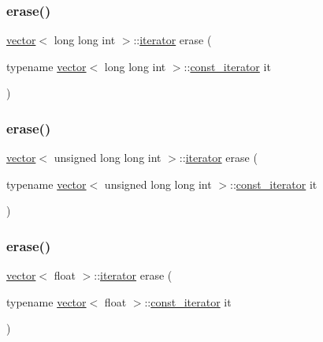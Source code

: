 \mbox{\label{classvector_a20e68bb7349c1076f3cd6d6a8310ac0a}} 
\subsubsection{\texorpdfstring{erase()}{erase()}\hspace{0.1cm}{\footnotesize\ttfamily [12/28]}}
{\footnotesize\ttfamily \mbox{\hyperlink{classvector}{vector}}$<$ long long int $>$\+::\mbox{\hyperlink{classvector_a35c955cacac6aacaa1e82874b1628865}{iterator}} erase (\begin{DoxyParamCaption}\item[{typename \mbox{\hyperlink{classvector}{vector}}$<$ long long int $>$\+::\mbox{\hyperlink{classvector_a2fc97dce62b7053449cc868607540dba}{const\+\_\+iterator}}}]{it }\end{DoxyParamCaption})}

\mbox{\label{classvector_a5b5a501da74cb2390dfef3500d0f690e}} 
\subsubsection{\texorpdfstring{erase()}{erase()}\hspace{0.1cm}{\footnotesize\ttfamily [13/28]}}
{\footnotesize\ttfamily \mbox{\hyperlink{classvector}{vector}}$<$ unsigned long long int $>$\+::\mbox{\hyperlink{classvector_a35c955cacac6aacaa1e82874b1628865}{iterator}} erase (\begin{DoxyParamCaption}\item[{typename \mbox{\hyperlink{classvector}{vector}}$<$ unsigned long long int $>$\+::\mbox{\hyperlink{classvector_a2fc97dce62b7053449cc868607540dba}{const\+\_\+iterator}}}]{it }\end{DoxyParamCaption})}

\mbox{\label{classvector_ab265d1545de5cbda30a5cfd2f125af2c}} 
\subsubsection{\texorpdfstring{erase()}{erase()}\hspace{0.1cm}{\footnotesize\ttfamily [14/28]}}
{\footnotesize\ttfamily \mbox{\hyperlink{classvector}{vector}}$<$ float $>$\+::\mbox{\hyperlink{classvector_a35c955cacac6aacaa1e82874b1628865}{iterator}} erase (\begin{DoxyParamCaption}\item[{typename \mbox{\hyperlink{classvector}{vector}}$<$ float $>$\+::\mbox{\hyperlink{classvector_a2fc97dce62b7053449cc868607540dba}{const\+\_\+iterator}}}]{it }\end{DoxyParamCaption})}

